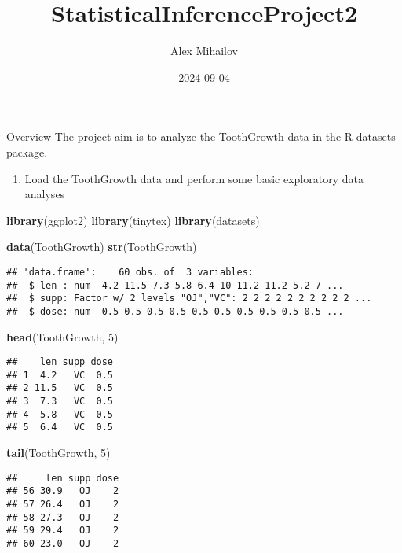 \documentclass[
]{article}
\title{StatisticalInferenceProject2}
\author{Alex Mihailov}
\date{2024-09-04}
\newenvironment{Shaded}{\begin{snugshade}}{\end{snugshade}}
\newcommand{\DecValTok}[1]{\textcolor[rgb]{0.00,0.00,0.81}{#1}}
\newcommand{\FunctionTok}[1]{\textcolor[rgb]{0.13,0.29,0.53}{\textbf{#1}}}
\newcommand{\NormalTok}[1]{#1}
\providecommand{\tightlist}{%
  \setlength{\itemsep}{0pt}\setlength{\parskip}{0pt}}
\begin{document}
\maketitle

Overview The project aim is to analyze the ToothGrowth data in the R
datasets package.

\begin{enumerate}
\def\labelenumi{\arabic{enumi}.}
\tightlist
\item
  Load the ToothGrowth data and perform some basic exploratory data
  analyses
\end{enumerate}

\begin{Shaded}
\begin{Highlighting}[]
\FunctionTok{library}\NormalTok{(ggplot2)}
\FunctionTok{library}\NormalTok{(tinytex)}
\FunctionTok{library}\NormalTok{(datasets)}

\FunctionTok{data}\NormalTok{(ToothGrowth)}
\FunctionTok{str}\NormalTok{(ToothGrowth)}
\end{Highlighting}
\end{Shaded}

\begin{verbatim}
## 'data.frame':    60 obs. of  3 variables:
##  $ len : num  4.2 11.5 7.3 5.8 6.4 10 11.2 11.2 5.2 7 ...
##  $ supp: Factor w/ 2 levels "OJ","VC": 2 2 2 2 2 2 2 2 2 2 ...
##  $ dose: num  0.5 0.5 0.5 0.5 0.5 0.5 0.5 0.5 0.5 0.5 ...
\end{verbatim}

\begin{Shaded}
\begin{Highlighting}[]
\FunctionTok{head}\NormalTok{(ToothGrowth, }\DecValTok{5}\NormalTok{)}
\end{Highlighting}
\end{Shaded}

\begin{verbatim}
##    len supp dose
## 1  4.2   VC  0.5
## 2 11.5   VC  0.5
## 3  7.3   VC  0.5
## 4  5.8   VC  0.5
## 5  6.4   VC  0.5
\end{verbatim}

\begin{Shaded}
\begin{Highlighting}[]
\FunctionTok{tail}\NormalTok{(ToothGrowth, }\DecValTok{5}\NormalTok{)}
\end{Highlighting}
\end{Shaded}

\begin{verbatim}
##     len supp dose
## 56 30.9   OJ    2
## 57 26.4   OJ    2
## 58 27.3   OJ    2
## 59 29.4   OJ    2
## 60 23.0   OJ    2
\end{verbatim}
\end{document}
